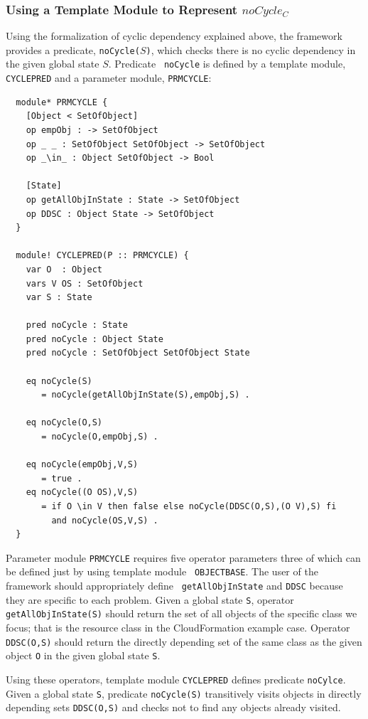 \documentclass[12pt]{report}
\newcommand{\stt}[1]{{\small{\tt {#1}}}}
\begin{document}
\subsubsection{Using a Template Module to Represent $noCycle_C$}
Using the formalization of cyclic dependency explained above, the
framework provides a predicate, \stt{noCycle($S$)}, which checks there
is no cyclic dependency in the given global state $S$. Predicate {\tt
  noCycle} is defined by a template module, {\tt CYCLEPRED} and a
parameter module, {\tt PRMCYCLE}:
\small
\begin{verbatim}
  module* PRMCYCLE {
    [Object < SetOfObject]
    op empObj : -> SetOfObject
    op _ _ : SetOfObject SetOfObject -> SetOfObject
    op _\in_ : Object SetOfObject -> Bool
  
    [State]
    op getAllObjInState : State -> SetOfObject
    op DDSC : Object State -> SetOfObject
  }

  module! CYCLEPRED(P :: PRMCYCLE) {
    var O  : Object
    vars V OS : SetOfObject
    var S : State
  
    pred noCycle : State
    pred noCycle : Object State
    pred noCycle : SetOfObject SetOfObject State
  
    eq noCycle(S)
       = noCycle(getAllObjInState(S),empObj,S) .
  
    eq noCycle(O,S)
       = noCycle(O,empObj,S) .
  
    eq noCycle(empObj,V,S)
       = true .
    eq noCycle((O OS),V,S)
       = if O \in V then false else noCycle(DDSC(O,S),(O V),S) fi
         and noCycle(OS,V,S) .
  }
\end{verbatim}
\normalsize
Parameter module {\tt PRMCYCLE} requires five operator parameters
three of which can be defined just by using template module {\tt
  OBJECTBASE}.
The user of the framework should appropriately define {\tt
  getAllObjInState} and {\tt DDSC} because they are specific to each
problem. 
Given a global state {\tt S}, operator \stt{getAllObjInState(S)} should return
the set of all objects of the specific class we focus; that is the
resource class in the CloudFormation example case. Operator
\stt{DDSC(O,S)} should return the directly depending set of the same class
as the given object {\tt O} in the given global state {\tt S}.

Using these operators, template module {\tt CYCLEPRED} defines predicate
{\tt noCylce}. Given
a global state {\tt S}, predicate \stt{noCycle(S)} transitively visits objects in
directly depending sets \stt{DDSC(O,S)} and checks not to find any
objects already visited.
\end{document}
